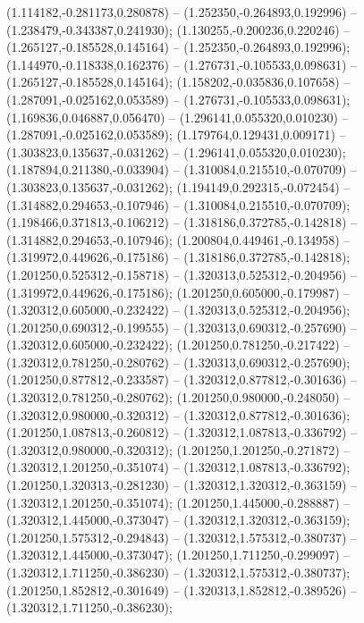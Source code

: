  (1.114182,-0.281173,0.280878) -- (1.252350,-0.264893,0.192996) -- (1.238479,-0.343387,0.241930);
 (1.130255,-0.200236,0.220246) -- (1.265127,-0.185528,0.145164) -- (1.252350,-0.264893,0.192996);
 (1.144970,-0.118338,0.162376) -- (1.276731,-0.105533,0.098631) -- (1.265127,-0.185528,0.145164);
 (1.158202,-0.035836,0.107658) -- (1.287091,-0.025162,0.053589) -- (1.276731,-0.105533,0.098631);
 (1.169836,0.046887,0.056470) -- (1.296141,0.055320,0.010230) -- (1.287091,-0.025162,0.053589);
 (1.179764,0.129431,0.009171) -- (1.303823,0.135637,-0.031262) -- (1.296141,0.055320,0.010230);
 (1.187894,0.211380,-0.033904) -- (1.310084,0.215510,-0.070709) -- (1.303823,0.135637,-0.031262);
 (1.194149,0.292315,-0.072454) -- (1.314882,0.294653,-0.107946) -- (1.310084,0.215510,-0.070709);
 (1.198466,0.371813,-0.106212) -- (1.318186,0.372785,-0.142818) -- (1.314882,0.294653,-0.107946);
 (1.200804,0.449461,-0.134958) -- (1.319972,0.449626,-0.175186) -- (1.318186,0.372785,-0.142818);
 (1.201250,0.525312,-0.158718) -- (1.320313,0.525312,-0.204956) -- (1.319972,0.449626,-0.175186);
 (1.201250,0.605000,-0.179987) -- (1.320312,0.605000,-0.232422) -- (1.320313,0.525312,-0.204956);
 (1.201250,0.690312,-0.199555) -- (1.320313,0.690312,-0.257690) -- (1.320312,0.605000,-0.232422);
 (1.201250,0.781250,-0.217422) -- (1.320312,0.781250,-0.280762) -- (1.320313,0.690312,-0.257690);
 (1.201250,0.877812,-0.233587) -- (1.320312,0.877812,-0.301636) -- (1.320312,0.781250,-0.280762);
 (1.201250,0.980000,-0.248050) -- (1.320312,0.980000,-0.320312) -- (1.320312,0.877812,-0.301636);
 (1.201250,1.087813,-0.260812) -- (1.320312,1.087813,-0.336792) -- (1.320312,0.980000,-0.320312);
 (1.201250,1.201250,-0.271872) -- (1.320312,1.201250,-0.351074) -- (1.320312,1.087813,-0.336792);
 (1.201250,1.320313,-0.281230) -- (1.320312,1.320312,-0.363159) -- (1.320312,1.201250,-0.351074);
 (1.201250,1.445000,-0.288887) -- (1.320312,1.445000,-0.373047) -- (1.320312,1.320312,-0.363159);
 (1.201250,1.575312,-0.294843) -- (1.320312,1.575312,-0.380737) -- (1.320312,1.445000,-0.373047);
 (1.201250,1.711250,-0.299097) -- (1.320312,1.711250,-0.386230) -- (1.320312,1.575312,-0.380737);
 (1.201250,1.852812,-0.301649) -- (1.320313,1.852812,-0.389526) -- (1.320312,1.711250,-0.386230);
